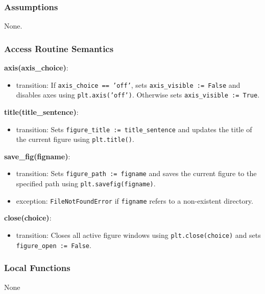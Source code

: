 \documentclass[12pt, titlepage]{article}
\begin{document}
\subsubsection{Assumptions}
None.

\subsubsection{Access Routine Semantics}

\noindent \textbf{axis(axis\_choice)}:
\begin{itemize}
  \item transition: If \texttt{axis\_choice == 'off'}, sets \texttt{axis\_visible := False} and disables axes using \texttt{plt.axis('off')}. Otherwise sets \texttt{axis\_visible := True}.
\end{itemize}

\noindent \textbf{title(title\_sentence)}:
\begin{itemize}
  \item transition: Sets \texttt{figure\_title := title\_sentence} and updates the title of the current figure using \texttt{plt.title()}.
\end{itemize}

\noindent \textbf{save\_fig(figname)}:
\begin{itemize}
  \item transition: Sets \texttt{figure\_path := figname} and saves the current figure to the specified path using \texttt{plt.savefig(figname)}.
  \item exception: \texttt{FileNotFoundError} if \texttt{figname} refers to a non-existent directory.
\end{itemize}

\noindent \textbf{close(choice)}:
\begin{itemize}
  \item transition: Closes all active figure windows using \texttt{plt.close(choice)} and sets \texttt{figure\_open := False}.
\end{itemize}


\subsubsection{Local Functions}
None
\end{document}

